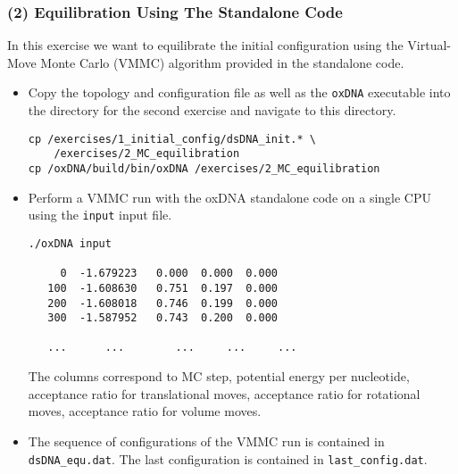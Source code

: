 \documentclass[slidestop,compress,9pt]{beamer}
\begin{document}
\begin{frame}[fragile]
\frametitle{(2) Equilibration Using The Standalone Code}
\small
In this exercise we want to equilibrate the initial configuration using the Virtual-Move Monte Carlo (VMMC) algorithm provided in the standalone code.\\[7pt]

\begin{itemize}
\item Copy the topology and configuration file as well as the \texttt{oxDNA} executable into the directory for the second exercise and navigate to this directory.
\begin{lstlisting}
cp /exercises/1_initial_config/dsDNA_init.* \ 
    /exercises/2_MC_equilibration
cp /oxDNA/build/bin/oxDNA /exercises/2_MC_equilibration
\end{lstlisting}
\item Perform a VMMC run with the oxDNA standalone code on a single CPU using the \texttt{input} input file.
\linespread{0.4}
\begin{lstlisting}
./oxDNA input 

     0  -1.679223   0.000  0.000  0.000   
   100  -1.608630   0.751  0.197  0.000   
   200  -1.608018   0.746  0.199  0.000   
   300  -1.587952   0.743  0.200  0.000   

   ...      ...        ...     ...     ...  
\end{lstlisting}
The columns correspond to MC step, potential energy per nucleotide, acceptance ratio for translational moves, acceptance ratio for rotational moves, acceptance ratio for volume moves.

\item The sequence of configurations of the VMMC run is contained in \texttt{dsDNA\_equ.dat}. The last configuration is contained in \texttt{last\_config.dat}.

\end{itemize}

\end{frame}
\end{document}
